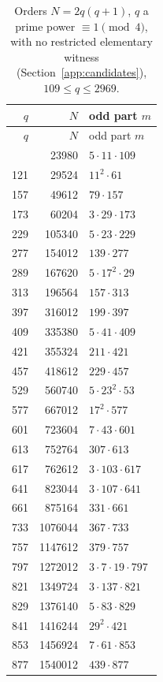\documentclass[11pt]{article}
\begin{document}
{\footnotesize
\begin{longtable}{r r l}
\caption{Orders \(N=2q(q+1)\), \(q\) a prime power \(\equiv1\pmod4\),
with no restricted elementary witness (Section~\ref{app:candidates}),
\(109\le q\le2969\).}\label{tab:candidates}\\
\hline
\(q\) & \(N\) & odd part \(m\)\\\hline
\endfirsthead
\hline
\(q\) & \(N\) & odd part \(m\)\\\hline
\endhead
\hline
\endfoot
109 & 23980 & \(5\cdot11\cdot109\) \\
121 & 29524 & \(11^{2}\cdot61\) \\
157 & 49612 & \(79\cdot157\) \\
173 & 60204 & \(3\cdot29\cdot173\) \\
229 & 105340 & \(5\cdot23\cdot229\) \\
277 & 154012 & \(139\cdot277\) \\
289 & 167620 & \(5\cdot17^{2}\cdot29\) \\
313 & 196564 & \(157\cdot313\) \\
397 & 316012 & \(199\cdot397\) \\
409 & 335380 & \(5\cdot41\cdot409\) \\
421 & 355324 & \(211\cdot421\) \\
457 & 418612 & \(229\cdot457\) \\
529 & 560740 & \(5\cdot23^{2}\cdot53\) \\
577 & 667012 & \(17^{2}\cdot577\) \\
601 & 723604 & \(7\cdot43\cdot601\) \\
613 & 752764 & \(307\cdot613\) \\
617 & 762612 & \(3\cdot103\cdot617\) \\
641 & 823044 & \(3\cdot107\cdot641\) \\
661 & 875164 & \(331\cdot661\) \\
733 & 1076044 & \(367\cdot733\) \\
757 & 1147612 & \(379\cdot757\) \\
797 & 1272012 & \(3\cdot7\cdot19\cdot797\) \\
821 & 1349724 & \(3\cdot137\cdot821\) \\
829 & 1376140 & \(5\cdot83\cdot829\) \\
841 & 1416244 & \(29^{2}\cdot421\) \\
853 & 1456924 & \(7\cdot61\cdot853\) \\
877 & 1540012 & \(439\cdot877\) \\

\end{longtable}}
\end{document}
